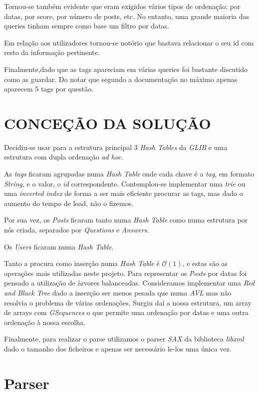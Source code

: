 \documentclass[letterpaper, 10 pt, conference]{IEEEtran}  %
\begin{document}
Tornou-se também evidente que eram exigidos vários tipos de ordenação: por datas, por score, por número de posts, etc. No entanto, uma grande maioria das queries tinham sempre como base um filtro por datas.

Em relação aos utilizadores tornou-se notório que bastava relacionar o seu id com resto da informação pertinente.

Finalmente,dado que as tags apareciam em várias queries foi bastante discutido como as guardar. Do notar que segundo a documentação no máximo apenas aparecem 5 tags por questão.

\section{CONCEÇÃO DA SOLUÇÃO}

Decidiu-se usar para a estrutura principal 3 \textit{Hash Tables} da \textit{GLIB} e uma estrutura com dupla ordenação \textit{ad hoc}.

As \textit{tags} ficaram agrupadas numa \textit{Hash Table} onde cada chave é a \textit{tag}, em formato \textit{String}, e o valor,  o \textit{id} correspondente.
Contemplou-se implementar uma \textit{trie} ou uma \textit{inverted index} de forma a ser mais eficiente procurar as tags, mas dado o aumento do tempo de load, não o fizemos.

Por sua vez, os \textit{Posts} ficaram tanto numa \textit{Hash Table} como numa estrutura por nós criada, separados por \textit{Questions} e \textit{Answers}.

Os \textit{Users} ficaram numa \textit{Hash Table}.

Tanto a procura como inserção numa \textit{Hash Table} é $\mathcal{O}(1)$, e estas são as operações mais utilizadas neste projeto.
Para representar os \textit{Posts} por datas foi pensado a utilização de àrvores balanceadas. Consideramos implementar uma \textit{Red and Black Tree} dado a inserção ser menos pesada que numa \textit{AVL} mas não resolvia o problema de várias ordenações. Surgiu daí a nossa estrutura, um array de arrays com \textit{GSequences} o que permite uma ordenação por datas e uma outra ordenação à nossa escolha.

Finalmente, para realizar o parse utilizamos o parser \textit{SAX} da biblioteca \textit{libxml} dado o tamanho dos ficheiros e apenas ser necessário le-los uma única vez.

\section{Parser}
\end{document}
